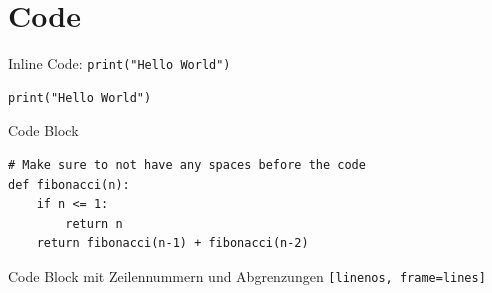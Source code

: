\section{Code}

Inline Code: \texttt{print("Hello World")}

\begin{listing}[ht]
	\begin{center}
		\begin{verbatim}
print("Hello World")
        \end{verbatim}
	\end{center}
	\caption{Code Block}
	\label{fig:code-block}
\end{listing}

\begin{listing}[ht]
	\begin{center}
		\begin{verbatim}
# Make sure to not have any spaces before the code
def fibonacci(n):
    if n <= 1:
        return n
    return fibonacci(n-1) + fibonacci(n-2)
        \end{verbatim}
	\end{center}
	\caption{Code Block mit Zeilennummern und Abgrenzungen \texttt{[linenos, frame=lines]}}
\end{listing}



